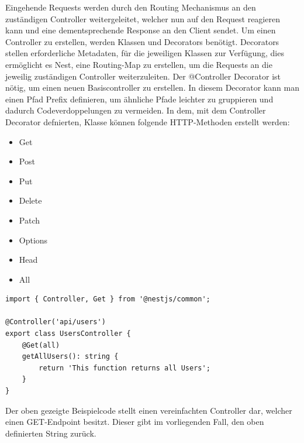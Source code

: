 Eingehende Requests werden durch den Routing Mechanismus an den zuständigen Controller weitergeleitet, welcher nun auf den Request reagieren kann und eine dementsprechende Response an den Client sendet. Um einen Controller zu erstellen, werden Klassen und Decorators benötigt. Decorators stellen erforderliche Metadaten, für die jeweiligen Klassen zur Verfügung, dies ermöglicht es Nest, eine Routing-Map zu erstellen, um die Requests an die jeweilig zuständigen Controller weiterzuleiten.
\newline
Der @Controller Decorator ist nötig, um einen neuen Basiscontroller zu erstellen. In diesem Decorator kann man einen Pfad Prefix definieren, um ähnliche Pfade leichter zu gruppieren und dadurch Codeverdoppelungen zu vermeiden. In dem, mit dem Controller Decorator defnierten, Klasse können folgende HTTP-Methoden erstellt werden:

\begin{itemize}
    \item Get
    \item Post
    \item Put
    \item Delete
    \item Patch
    \item Options
    \item Head
    \item All
\end{itemize}

\vspace{10mm}

\begin{lstlisting}
import { Controller, Get } from '@nestjs/common';

@Controller('api/users')
export class UsersController {
    @Get(all)
    getAllUsers(): string {
        return 'This function returns all Users';
    }
}
\end{lstlisting}

Der oben gezeigte Beispielcode stellt einen vereinfachten Controller dar, welcher einen GET-Endpoint besitzt. Dieser gibt im vorliegenden Fall, den oben definierten String zurück.
\cite{Nest_js_Controllers}


